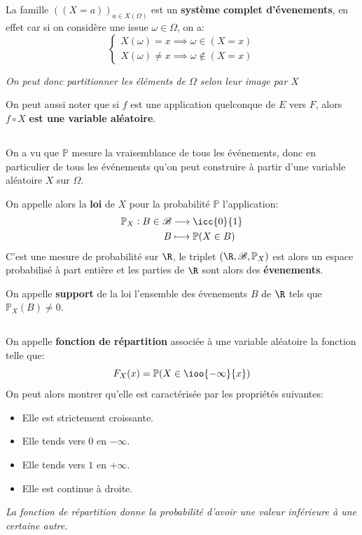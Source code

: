 \subsection*{}
La famille \(((X = a))_{a \in X(\Omega)}\) est un \textbf{système complet d'évenements}, en effet car si on considère une issue \(\omega \in \Omega\), on a:
\[
   \begin{cases}
      X(\omega) = x \implies \omega \in (X = x)\\  
      X(\omega) \neq x \implies \omega \notin (X = x)   
   \end{cases} 
\]
\begin{center}
   \textit{On peut donc partitionner les éléments de \(\Omega\) selon leur image par \(X\)}
\end{center}
On peut aussi noter que si \(f\) est une application quelconque de \(E\) vers \(F\), alors \(f \circ X\) \textbf{est une variable aléatoire}.
\pagebreak

\subsection*{}
On a vu que \(\mathbb{P}\) mesure la vraisemblance de tous les événements, donc en particulier de tous les événements qu'on peut construire à partir d'une variable aléatoire \(X\) sur \(\Omega\).\<

On appelle alors la \textbf{loi} de \(X\) pour la probabilité \(\mathbb{P}\) l'application:
\[
   \begin{aligned}
      \mathbb{P}_X: B \in \mathscr{B} &\longrightarrow \icc{0}{1}\\
      B &\longmapsto \mathbb{P}(X \in B)
   \end{aligned}
\]
C'est une mesure de probabilité sur \(\R\), le triplet \((\R, \mathscr{B}, \mathbb{P}_X)\) est alors un espace probabilisé à part entière et les parties de \(\R\) sont alors des \textbf{évenements}.\<

On appelle \textbf{support} de la loi l'ensemble des évenements \(B\) de \(\R\) tels que  \(\mathbb{P}_X(B) \neq 0\).\+

\subsection*{}
On appelle \textbf{fonction de répartition} associée à une variable aléatoire la fonction telle que:
\[
   F_X(x) = \mathbb{P}(X \in \ioo{-\infty}{x})   
\]
On peut alors montrer qu'elle est caractérisée par les propriétés suivantes:
\begin{itemize}
   \item Elle est strictement croissante.
   \item Elle tends vers \(0\) en \(-\infty\).
   \item Elle tends vers \(1\) en \(+\infty\).
   \item Elle est continue à droite.
\end{itemize}
\begin{center}
   \textit{La fonction de répartition donne la probabilité d'avoir une valeur inférieure à une certaine autre.}
\end{center}

